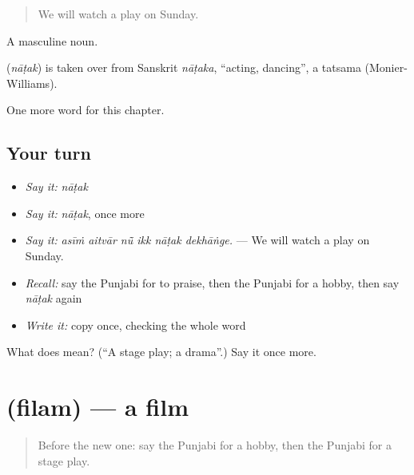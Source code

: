\begin{quote}
We will watch a play on Sunday.
\end{quote}

A masculine noun.

\begin{cousinweb}
\textbf{} (\emph{nāṭak}) is taken over from Sanskrit \emph{nāṭaka}, \textquotedblleft{}acting, dancing\textquotedblright{}, a tatsama (Monier-Williams).
\end{cousinweb}

\begin{grammarlens}[title={What you've built}]
One more word for this chapter.
\end{grammarlens}

\subsection*{Your turn}
\begin{itemize}
\raggedright
  \item \emph{Say it:} \emph{nāṭak}
  \item \emph{Say it:} \emph{nāṭak}, once more
  \item \emph{Say it:} \emph{asīṁ aitvār nū̃ ikk nāṭak dekhāṅge.} — We will watch a play on Sunday.
  \item \emph{Recall:} say the Punjabi for to praise, then the Punjabi for a hobby, then say \emph{nāṭak} again
  \item \emph{Write it:} copy \textbf{} once, checking the whole word
\end{itemize}

\begin{tcolorbox}[breakable,colback=teal!4,colframe=teal!35!black,title={Before you move on}]
What does  mean? (\textquotedblleft{}A stage play; a drama\textquotedblright{}.) Say it once more.
\end{tcolorbox}
\section[\texorpdfstring{\pa{ਫ਼ਿਲਮ} (filam)}{ਫ਼ਿਲਮ (filam)}]{ (filam) — a film}

\label{lesson:PA-C350-filam}



\begin{quote}
Before the new one: say the Punjabi for a hobby, then the Punjabi for a stage play.
\end{quote}

